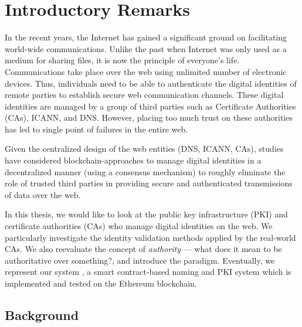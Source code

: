 
\chapter{Introductory Remarks}

\setcounter{page}{1}

In the recent years, the Internet has gained a significant ground on facilitating world-wide communications. Unlike the past when Internet was only used as a medium for sharing files, it is now the principle of everyone's life. Communications take place over the web using unlimited number of electronic devices. Thus, individuals need to be able to authenticate the digital identities of remote parties to establish secure web communication channels. These digital identities are managed by a group of third parties such as Certificate Authorities (CAs), ICANN, and DNS. However, placing too much trust on these authorities has led to single point of failures in the entire web. 
 
Given the centralized design of the web entities (\ie DNS, ICANN, CAs), studies have considered blockchain-approaches to manage digital identities in a decentralized manner (using a consensus mechanism) to roughly eliminate the role of trusted third parties in providing secure and authenticated transmissions of data over the web. 

In this thesis, we would like to look at the public key infrastructure (PKI) and certificate authorities (CAs) who manage digital identities on the web. We particularly investigate the identity validation methods applied by the real-world CAs. We also reevaluate the concept of \emph{authority} --- what does it mean to be authoritative over something?, and introduce the \UA paradigm. Eventually, we represent our system \Ghazalstar, a smart contract-based naming and PKI \UA system which is implemented and tested on the Ethereum blockchain.

\section{Background}

